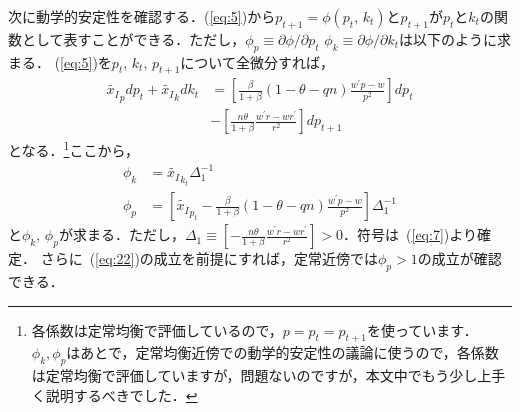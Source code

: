 \documentclass[12pt,a4paper]{jsarticle}
\begin{document}
次に動学的安定性を確認する．(\ref{eq:5})から$p_{t+1} =\phi(p_{t}, \, k_{t})$と$p_{t+1}$が$p_{t}$と$k_{t}$の関数として表すことができる．ただし，$\phi_{p} \equiv \partial \phi/ \partial p_{t}$ $\phi_{k} \equiv \partial \phi/ \partial k_{t}$は以下のように求まる．
(\ref{eq:5})を$p_{t}, \, k_{t}, \, p_{t+1}$について全微分すれば，
\begin{align}
  \tilde{x_{I}}_{p} dp_{t} +\tilde{x_{I}}_{k} dk_{t} &= \left[\frac{\beta}{1+\beta}(1-\theta-qn) \frac{w^{\prime}p -w}{p^{2}} \right]dp_{t}  \nonumber \\
&- \left[\frac{n \theta}{1+\beta}\frac{  w^{\prime}r - wr^{\prime}}{r^{2} } 
 \right]dp_{t+1} 
\end{align}
となる．\footnote{
各係数は定常均衡で評価しているので，$ p=p_{t} = p_{t+1}$を使っています．$\phi_{k}, \phi_{p}$はあとで，定常均衡近傍での動学的安定性の議論に使うので，各係数は定常均衡で評価していますが，問題ないのですが，本文中でもう少し上手く説明するべきでした．
}ここから，
\begin{align}
 \phi_{k} &=\tilde{x_{I}}_{k_{t}} \Delta_{1}^{-1}  \label{eq:19} \\
\phi_{p} &= \left[\tilde{x_{I}}_{p_{t}} - \frac{\beta}{1+\beta}(1-\theta-qn) \frac{w^{\prime}p -w}{p^{2}}   \right] \Delta_{1}^{-1}  \label{eq:20}
\end{align}
と$\phi_{k}, \, \phi_{p}$が求まる．ただし，$\Delta_{1} \equiv \left[- \frac{n \theta}{1+\beta}\frac{  w^{\prime}r - wr^{\prime}}{r^{2}} \right] >0$．符号は~(\ref{eq:7})より確定．
さらに~(\ref{eq:22})の成立を前提にすれば，定常近傍では$\phi_{p}>1$の成立が確認できる．
\end{document}
